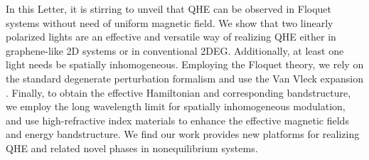 In this Letter, it is stirring to unveil that QHE can be observed in Floquet systems without need of uniform magnetic field.
We show that two linearly polarized lights are an effective and versatile way of realizing QHE either in graphene-like 2D systems or in conventional 2DEG.
Additionally, at least one light needs be spatially inhomogeneous.
Employing the Floquet theory, we rely on the standard degenerate perturbation formalism and use the Van Vleck expansion \cite{MBL, supp, AEE}.
Finally, to obtain the effective Hamiltonian and corresponding bandstructure, we employ the long wavelength limit for spatially inhomogeneous modulation, and use high-refractive index materials to enhance the effective magnetic fields and energy bandstructure.
We find our work provides new platforms for realizing QHE and related novel phases in nonequilibrium systems.

